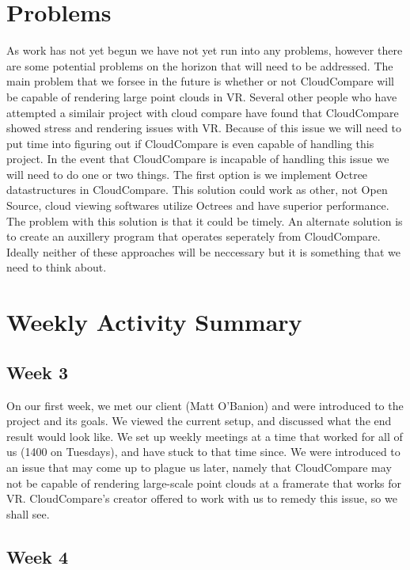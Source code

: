 \documentclass{article}
\begin{document}
\section{Problems}

As work has not yet begun we have not yet run into any problems, however there are some potential problems on the horizon that will need to be addressed.
The main problem that we forsee in the future is whether or not CloudCompare will be capable of rendering large point clouds in VR.
Several other people who have attempted a similair project with cloud compare have found that CloudCompare showed stress and rendering issues with VR.
Because of this issue we will need to put time into figuring out if CloudCompare is even capable of handling this project.
In the event that CloudCompare is incapable of handling this issue we will need to do one or two things.
The first option is we implement Octree datastructures in CloudCompare.
This solution could work as other, not Open Source, cloud viewing softwares utilize Octrees and have superior performance.
The problem with this solution is that it could be timely.
An alternate solution is to create an auxillery program that operates seperately from CloudCompare.
Ideally neither of these approaches will be neccessary but it is something that we need to think about.

\section{Weekly Activity Summary}
\subsection{Week 3}

On our first week, we met our client (Matt O'Banion) and were introduced to the project and its goals. 
We viewed the current setup, and discussed what the end result would look like. We set up weekly meetings at a time that worked for all of us (1400 on Tuesdays), and have stuck to that time since. 
We were introduced to an issue that may come up to plague us later, namely that CloudCompare may not be capable of rendering large-scale point clouds at a framerate that works for VR. 
CloudCompare's creator offered to work with us to remedy this issue, so we shall see.

\subsection{Week 4}
\end{document}
